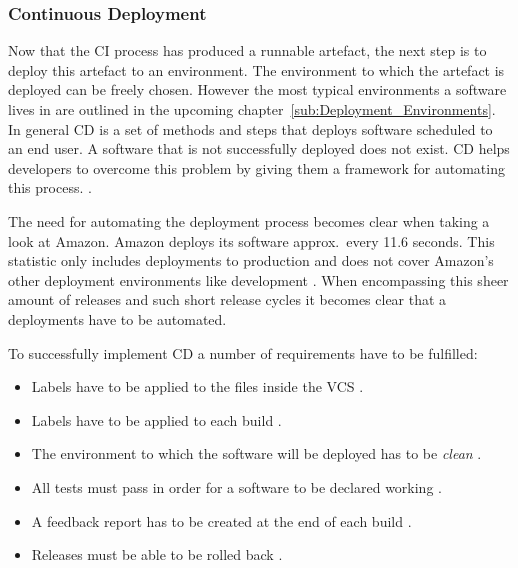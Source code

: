 \subsubsection{Continuous Deployment}%
\label{ssub:Continuous_Deployment}
Now that the \ac{CI} process has produced a runnable artefact, the next step is
to deploy this artefact to an environment. The environment to which the
artefact is deployed can be freely chosen. However the most typical
environments a software lives in are outlined in the upcoming
chapter~\ref{sub:Deployment_Environments}. In general \ac{CD} is a set of
methods and steps that deploys software scheduled to an end user. A software
that is not successfully deployed does not exist. \ac{CD} helps developers to
overcome this problem by giving them a framework for automating this process.
\autocite[pp.  190]{MatyasContinuousIntegration2007}.

The need for automating the deployment process becomes clear when taking a look
at Amazon. Amazon deploys its software approx.\ every 11.6 seconds. This
statistic only includes deployments to production and does not cover Amazon's
other deployment environments like development
\autocite{JenkinsVelocityCulture2011}. When encompassing this sheer amount of
releases and such short release cycles it becomes clear that a deployments have
to be automated.

To successfully implement \ac{CD} a number of requirements have to be
fulfilled: 
\begin{itemize}
  \item Labels have to be applied to the files inside the \ac{VCS}
    \autocite[pp. 191-194]{MatyasContinuousIntegration2007}.
  \item Labels have to be applied to each build \autocite[pp.
    195f.]{MatyasContinuousIntegration2007}.
  \item The environment to which the software will be deployed has to be
    \textit{clean} \autocite[pp. 194f.]{MatyasContinuousIntegration2007}.
  \item All tests must pass in order for a software to be declared working
    \autocite[p. 196]{MatyasContinuousIntegration2007}.
  \item A feedback report has to be created at the end of each build
    \autocite[pp. 196-198]{MatyasContinuousIntegration2007}.
  \item Releases must be able to be rolled back \autocite[p.
    199]{MatyasContinuousIntegration2007}.
\end{itemize}

